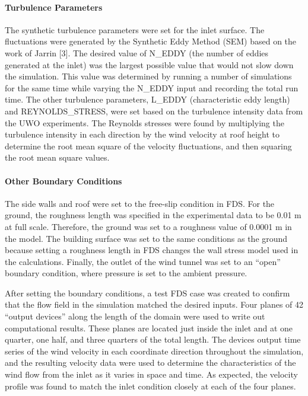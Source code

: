 \paragraph{Turbulence Parameters}

The synthetic turbulence parameters were set for the inlet surface. The fluctuations were generated by the Synthetic Eddy Method (SEM) based on the work of Jarrin [3]. The desired value of {\ct N\_EDDY} (the number of eddies generated at the inlet) was the largest possible value that would not slow down the simulation. This value was determined by running a number of simulations for the same time while varying the {\ct N\_EDDY} input and recording the total run time. The other turbulence parameters, {\ct L\_EDDY} (characteristic eddy length) and {\ct REYNOLDS\_STRESS}, were set based on the turbulence intensity data from the UWO experiments. The Reynolds stresses were found by multiplying the turbulence intensity in each direction by the wind velocity at roof height to determine the root mean square of the velocity fluctuations, and then squaring the root mean square values.

\paragraph{Other Boundary Conditions}

The side walls and roof were set to the free-slip condition in FDS. For the ground, the roughness length was specified in the experimental data to be 0.01 m at full scale. Therefore, the ground was set to a roughness value of 0.0001 m in the model. The building surface was set to the same conditions as the ground because setting a roughness length in FDS changes the wall stress model used in the calculations. Finally, the outlet of the wind tunnel was set to an ``open'' boundary condition, where pressure is set to the ambient pressure.

After setting the boundary conditions, a test FDS case was created to confirm that the flow field in the simulation matched the desired inputs. Four planes of 42 ``output devices'' along the length of the domain were used to write out computational results. These planes are located just inside the inlet and at one quarter, one half, and three quarters of the total length. The devices output time series of the wind velocity in each coordinate direction throughout the simulation, and the resulting velocity data were used to determine the characteristics of the wind flow from the inlet as it varies in space and time. As expected, the velocity profile was found to match the inlet condition closely at each of the four planes.

